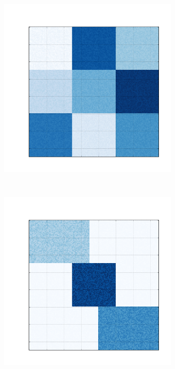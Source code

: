 \documentclass[10pt]{beamer}
\begin{document}
\begin{frame}
\begin{figure} [htpb]
\begin{subfigure}[b]{0.16\textwidth}
          \caption{}
          \label{fig:bic-syntetic-structure:b}
      \end{subfigure}
      ~
      \begin{subfigure}[b]{0.16\textwidth}
          \includegraphics[width=\textwidth]{img/c-bic-structure.png}
          \caption{}
          \label{fig:bic-syntetic-structure:c}
      \end{subfigure}
      ~
      \begin{subfigure}[b]{0.16\textwidth}
          \includegraphics[width=\textwidth]{img/d-bic-structure.png}

\end{subfigure}
\end{figure}
\end{frame}
\end{document}
